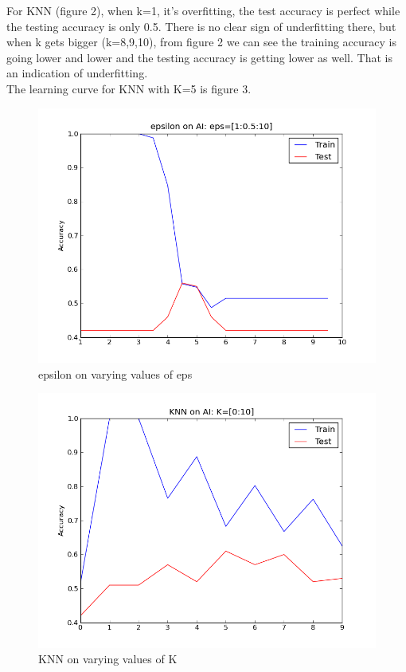 \documentclass[a4paper,11pt]{article}
\begin{document}
For KNN (figure 2), when k=1, it's overfitting, the test accuracy is perfect while the testing accuracy
is only 0.5. There is no clear sign of underfitting there, but when k
gets bigger (k=8,9,10), from figure 2 we can see the training
accuracy is going lower and lower and the testing accuracy is getting
lower as well. That is an indication of underfitting.\\
The learning curve for KNN with K=5 is figure 3.
\begin{figure}[h!]
  \caption{epsilon on varying values of eps}
 \includegraphics[scale=0.7]{epsOnAi_hyper.png}
\end{figure}
\begin{figure}[h!]
  \caption{KNN on varying values of K}
   \includegraphics[scale=0.7]{knnOnAi_hyper.png}
\end{figure}
\end{document}
